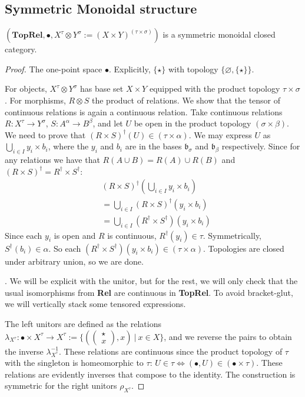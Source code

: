 \begin{fullwidth}
\subsection{Symmetric Monoidal structure}

\begin{proposition}
$(\mathbf{TopRel},\bullet,X^\tau \otimes Y^\sigma := (X \times Y)^{(\tau \times \sigma)})$ is a symmetric monoidal closed category.
\begin{proof}

 The one-point space $\bullet$. Explicitly, $\{\star\}$ with topology $\{\varnothing,\{\star\}\}$.

 For objects, $X^\tau \otimes Y^\sigma$ has base set $X \times Y$ equipped with the product topology $\tau \times \sigma$. For morphisms, $R \otimes S$ the product of relations. We show that the tensor of continuous relations is again a continuous relation. Take continuous relations $R: X^\tau \rightarrow Y^\sigma$, $S: A^\alpha \rightarrow B^\beta$, and let $U$ be open in the product topology $(\sigma \times \beta)$. We need to prove that $(R \times S)^\dag(U) \in (\tau \times \alpha)$. We may express $U$ as $\bigcup\limits_{i \in I} y_i \times b_i$, where the $y_i$ and $b_i$ are in the bases $\mathfrak{b}_\sigma$ and $\mathfrak{b}_\beta$ respectively. Since for any relations we have that $R(A \cup B) = R(A) \cup R(B)$ and $(R \times S)^\dag = R^\dag \times S^\dag$:
\begin{align*}
&(R \times S)^\dag(\bigcup\limits_{i \in I} y_i \times b_i)\\
 &= \bigcup\limits_{i \in I}(R \times S)^\dag(y_i \times b_i)\\
 &= \bigcup\limits_{i \in I}(R^\dag \times S^\dag)(y_i \times b_i)
 \end{align*}
Since each $y_i$ is open and $R$ is continuous, $R^\dag(y_i) \in \tau$. Symmetrically, $S^\dag(b_i) \in \alpha$. So each $(R^\dag \times S^\dag)(y_i \times b_i) \in (\tau \times \alpha)$. Topologies are closed under arbitrary union, so we are done.

. We will be explicit with the unitor, but for the rest, we will only check that the usual isomorphisms from \textbf{Rel} are continuous in \textbf{TopRel}. To avoid bracket-glut, we will vertically stack some tensored expressions.

 The left unitors are defined as the relations $\lambda_{X^{\tau}}: \bullet \times X^\tau \rightarrow X^\tau := \{(\begin{pmatrix}\star \\x \end{pmatrix}, x) \ | \ x \in X\}$, and we reverse the pairs to obtain the inverse $\lambda^{-1}_{X^{\tau}}$. These relations are continuous since the product topology of $\tau$ with the singleton is homeomorphic to $\tau$: $U \in \tau \iff (\bullet,U) \in (\bullet \times \tau)$. These relations are evidently inverses that compose to the identity. The construction is symmetric for the right unitors $\rho_{X^{\tau}}$.


\end{proof}
\end{proposition}
\end{fullwidth}
